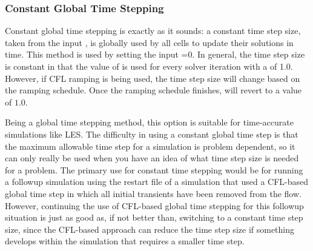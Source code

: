 \subsubsection{Constant Global Time Stepping}
\label{SEC:Time:Algorithms:Constant}

Constant global time stepping is exactly as it sounds: a constant time step
size, taken from the input , is globally
used by all cells to update their solutions in time.
%
This method is used by setting the input
=0.
%
In general, the time step size is constant in that the value of
 is used for every solver iteration with a
 of 1.0.
%
However, if CFL ramping is being used, the time step size will change based on
the ramping schedule.
%
Once the ramping schedule finishes,  will revert to a value of
$1.0$.
%


Being a global time stepping method, this option is suitable for time-accurate
simulations like LES.
%
The difficulty in using a constant global time step is that the maximum
allowable time step for a simulation is problem dependent, so it can only really
be used when you have an idea of what time step size is needed for a problem.
%
The primary use for constant time stepping would be for running a followup
simulation using the restart file of a simulation that used a CFL-based global
time step in which all initial transients have been removed from the flow.
%
However, continuing the use of CFL-based global time stepping for this followup
situation is just as good as, if not better than, switching to a constant time
step size, since the CFL-based approach can reduce the time step size if
something develops within the simulation that requires a smaller time step.


